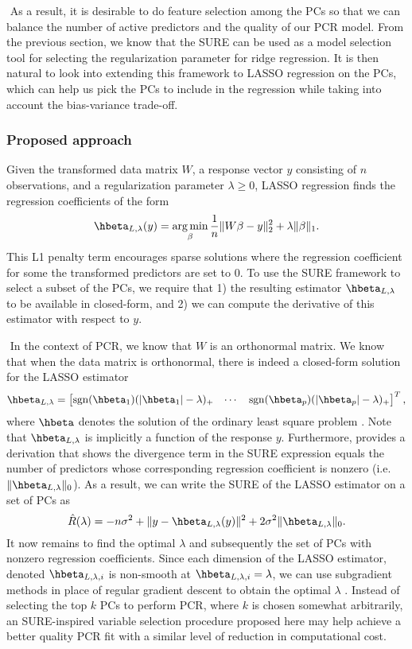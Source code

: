 $ $\newline
As a result, it is desirable to do feature selection among the PCs so that we can balance the number of active predictors and the quality of our PCR model. From the previous section, we know that the SURE can be used as a model selection tool for selecting the regularization parameter for ridge regression. It is then natural to look into extending this framework to LASSO regression on the PCs, which can help us pick the PCs to include in the regression while taking into account the bias-variance trade-off.

\subsubsection{Proposed approach}
Given the transformed data matrix $W$, a response vector $y$ consisting of $n$ observations, and a regularization parameter $\lambda\geq0$, LASSO regression finds the regression coefficients of the form
\[
\hbeta_{L,\lambda}(y) = \argmin_{\beta} \frac{1}{n}\|W\beta - y\|_2^2 + \lambda\|\beta\|_1.
\]
This L1 penalty term encourages sparse solutions where the regression coefficient for some the transformed predictors are set to $0$. To use the SURE framework to select a subset of the PCs, we require that 1) the resulting estimator $\hbeta_{L,\lambda}$ to be available in closed-form, and 2) we can compute the derivative of this estimator with respect to $y$.

$ $\newline
In the context of PCR, we know that $W$ is an orthonormal matrix. We know that when the data matrix is orthonormal, there is indeed a closed-form solution for the LASSO estimator
\[
\hbeta_{L,\lambda} = \begin{bmatrix} \sgn(\hbeta_1)(|\hbeta_1| - \lambda)_+ & \cdots & \sgn(\hbeta_p)(|\hbeta_p| - \lambda)_+ \end{bmatrix}^T,
\]
where $\hbeta$ denotes the solution of the ordinary least square problem \citep{gauraha2018introduction}. Note that $\hbeta_{L,\lambda}$ is implicitly a function of the response $y$. Furthermore, \citet{tibshirani2015stein} provides a derivation that shows the divergence term in the SURE expression equals the number of predictors whose corresponding regression coefficient is nonzero (i.e. $\|\hbeta_{L,\lambda}\|_0$). As a result, we can write the SURE of the LASSO estimator on a set of PCs as 
\[
\hat{R}(\lambda) = -n\sigma^2 + \| y - \hbeta_{L,\lambda}(y) \|^2 + 2\sigma^2\|\hbeta_{L,\lambda}\|_0.
\]
It now remains to find the optimal $\lambda$ and subsequently the set of PCs with nonzero regression coefficients. Since each dimension of the LASSO estimator, denoted $\hbeta_{L,\lambda,i}$ is non-smooth at $\hbeta_{L,\lambda,i} = \lambda$, we can use subgradient methods in place of regular gradient descent to obtain the optimal $\lambda$ \citep{shor2012minimization}. Instead of selecting the top $k$ PCs to perform PCR, where $k$ is chosen somewhat arbitrarily, an SURE-inspired variable selection procedure proposed here may help achieve a better quality PCR fit with a similar level of reduction in computational cost.

